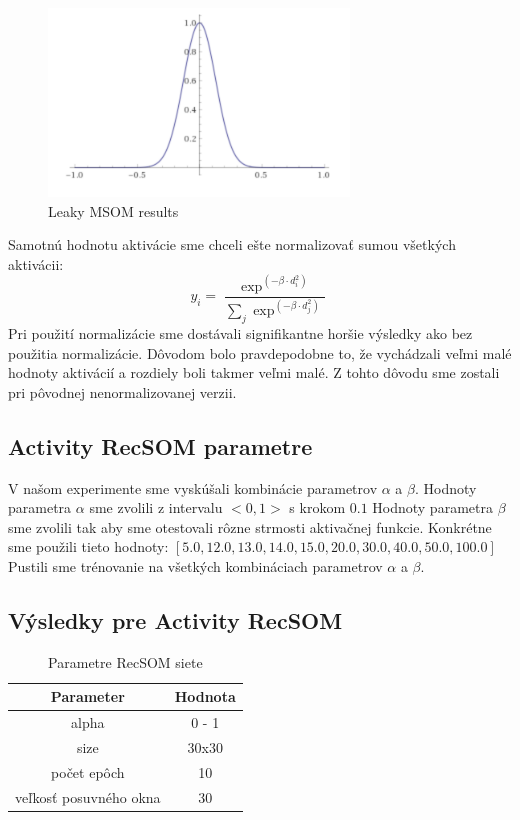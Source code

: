 \begin{figure}[H]
    \centering
    \includegraphics[width=8cm]{assets/gaus30}
    \caption{Leaky MSOM results}
\end{figure}

Samotnú hodnotu aktivácie sme chceli ešte normalizovať sumou všetkých aktivácii:
\begin{equation}
    y_{i} = \frac{\exp^{(-\beta \cdot d_{i}^{2})}}{\sum_{j} \exp^{(-\beta \cdot d_{j}^{2})}}
\end{equation}
Pri použití normalizácie sme dostávali signifikantne horšie výsledky
ako bez použitia normalizácie. Dôvodom bolo pravdepodobne to, že vychádzali veľmi malé
hodnoty aktivácií a rozdiely boli takmer veľmi malé. Z tohto dôvodu sme zostali 
pri pôvodnej nenormalizovanej verzii.

\subsection{Activity RecSOM parametre}
V našom experimente sme vyskúšali kombinácie parametrov $\alpha$ a $\beta$.
Hodnoty parametra $\alpha$ sme zvolili z intervalu $<0, 1>$ s krokom $0.1$
Hodnoty parametra $\beta$ sme zvolili tak aby sme otestovali rôzne strmosti aktivačnej funkcie.
Konkrétne sme použili tieto hodnoty: $[5.0, 12.0, 13.0, 14.0, 15.0, 20.0, 30.0, 40.0, 50.0, 100.0]$
Pustili sme trénovanie na všetkých kombináciach parametrov $\alpha$ a $\beta$.

\subsection{Výsledky pre Activity RecSOM}

\begin{table}[h!]
    \centering
    \begin{tabular}{|c|c|} 
     \hline
     Parameter & Hodnota \\ 
     \hline\hline
     alpha & 0 - 1  \\ 
     \hline
     size & 30x30  \\
     \hline
     počet epôch & 10  \\
     \hline
     veľkosť posuvného okna & 30  \\
     \hline
    \end{tabular}
    \caption{Parametre RecSOM siete}
    \label{table:1}
    \end{table}
    

